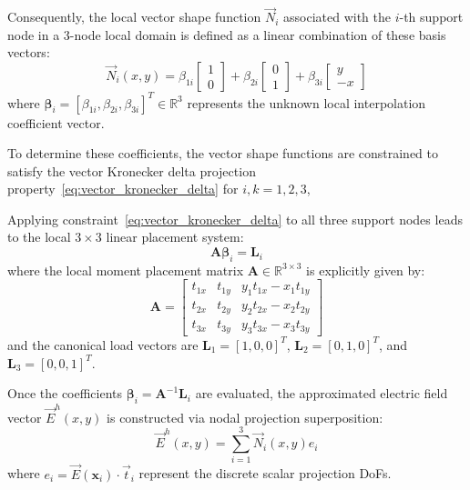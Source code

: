 \documentclass[preprint,12pt]{elsarticle}
\begin{document}
Consequently, the local vector shape function $\vec{N}_i$ associated with the $i$-th support node in a 3-node local domain is defined as a linear combination of these basis vectors:
\begin{equation}
    \vec{N}_i(x, y) = \beta_{1i} \begin{bmatrix} 1 \\ 0 \end{bmatrix} + \beta_{2i} \begin{bmatrix} 0 \\ 1 \end{bmatrix} + \beta_{3i} \begin{bmatrix} y \\ -x \end{bmatrix}
    \label{eq:N_i_L1}
\end{equation}
where $\boldsymbol{\beta}_i = [\beta_{1i}, \beta_{2i}, \beta_{3i}]^T \in \mathbb{R}^3$ represents the unknown local interpolation coefficient vector.

To determine these coefficients, the vector shape functions are constrained to satisfy the vector Kronecker delta projection property~\eqref{eq:vector_kronecker_delta} for $i,k=1,2,3$,

Applying constraint~\eqref{eq:vector_kronecker_delta} to all three support nodes leads to the local $3 \times 3$ linear placement system:
\begin{equation}
    \mathbf{A} \boldsymbol{\beta}_i = \mathbf{L}_i
    \label{eq:linear_placement_system}
\end{equation}
where the local moment placement matrix $\mathbf{A} \in \mathbb{R}^{3 \times 3}$ is explicitly given by:
\begin{equation}
    \mathbf{A} = \begin{bmatrix}
        t_{1x} & t_{1y} & y_1 t_{1x} - x_1 t_{1y} \\
        t_{2x} & t_{2y} & y_2 t_{2x} - x_2 t_{2y} \\
        t_{3x} & t_{3y} & y_3 t_{3x} - x_3 t_{3y}
    \end{bmatrix}
    \label{eq:matrix_A_L1}
\end{equation}
and the canonical load vectors are $\mathbf{L}_1 = [1, 0, 0]^T$, $\mathbf{L}_2 = [0,1,0]^T$, and $\mathbf{L}_3 = [0,0,1]^T$.

Once the coefficients $\boldsymbol{\beta}_i = \mathbf{A}^{-1} \mathbf{L}_i$ are evaluated, the approximated electric field vector $\vec{E}^h(x, y)$ is constructed via nodal projection superposition:
\begin{equation}
    \vec{E}^h(x, y) = \sum_{i=1}^3 \vec{N}_i(x, y) e_i
\end{equation}
where $e_i = \vec{E}(\mathbf{x}_i) \cdot \vec{t}_i$ represent the discrete scalar projection DoFs.
\end{document}
